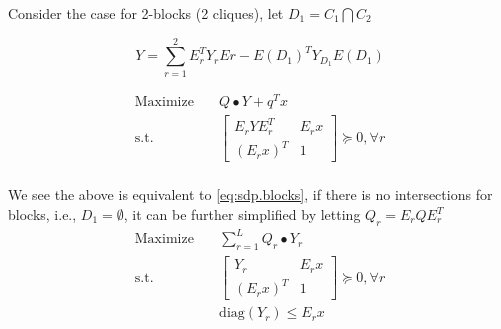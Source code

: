 \begin{frame}
  Consider the case for 2-blocks (2 cliques), let \(D_1 = C_1 \bigcap C_2\)

  \begin{equation}
    Y =  \sum_{r=1}^2 E_r^TY_r Er - E(D_1)^TY_{D_1}E(D_1)
  \end{equation}

  \begin{equation}
    \begin{aligned}
      \mathrm{Maximize}\quad & Q \bullet Y + q^Tx                               \\
      \mathrm{s.t.} \quad    & \begin{bmatrix}E_r Y E_r^T & E_rx \\ (E_rx)^T & 1\end{bmatrix}   \succeq 0, \forall r \\
    \end{aligned}
  \end{equation}

  We see the above is equivalent to \eqref{eq:sdp.blocks}, if there is no intersections for blocks, i.e., \(D_1 = \emptyset\),
  it can be further simplified by letting \(Q_r = E_r Q E_r^T\)
  \begin{equation}
    \begin{aligned}
      \mathrm{Maximize}\quad & \sum_{r=1}^L Q_r \bullet Y_r                     \\
      \mathrm{s.t.} \quad    & \begin{bmatrix}Y_r & E_rx \\ (E_rx)^T & 1\end{bmatrix}   \succeq 0, \forall r \\
                             & \mathrm{diag}(Y_r) \le E_r x
    \end{aligned}
  \end{equation}
\end{frame}

\begin{frame}
  \scriptsize
  \printbibliography
\end{frame}

